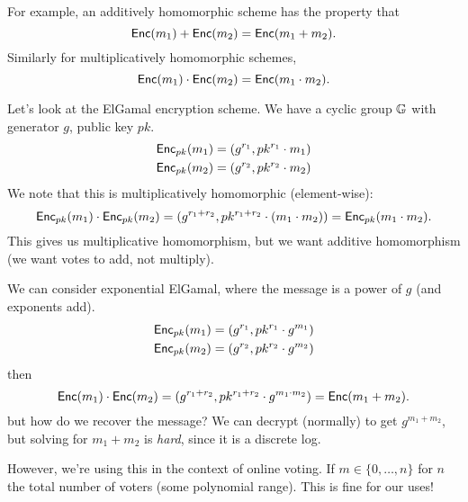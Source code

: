 For example, an additively homomorphic scheme has the property that
\[\operatorname{\mathsf{Enc}}(m_1) + \operatorname{\mathsf{Enc}}(m_2) = \operatorname{\mathsf{Enc}}(m_1 + m_2).\]
Similarly for multiplicatively homomorphic schemes,
\[\operatorname{\mathsf{Enc}}(m_1) \cdot \operatorname{\mathsf{Enc}}(m_2) = \operatorname{\mathsf{Enc}}(m_1 \cdot m_2).\]

\begin{example}
    Let's look at the ElGamal encryption scheme. We have a cyclic group $\mathbb G$ with generator $g$, public key $pk$.
    \begin{align*}
        \operatorname{\mathsf{Enc}}_{pk}(m_1) & =(g^{r_1}, pk^{r_1}\cdot m_1) \\
        \operatorname{\mathsf{Enc}}_{pk}(m_2) & =(g^{r_2}, pk^{r_2}\cdot m_2)
    \end{align*}
    We note that this is multiplicatively homomorphic (element-wise):
    \[\operatorname{\mathsf{Enc}}_{pk}(m_1)\cdot \operatorname{\mathsf{Enc}}_{pk}(m_2) = (g^{r_1 + r_2}, pk^{r_1 + r_2}\cdot (m_1\cdot m_2)) = \operatorname{\mathsf{Enc}}_{pk}(m_1\cdot m_2).\]
    This gives us multiplicative homomorphism, but we want additive homomorphism (we want votes to add, not multiply).

    We can consider exponential ElGamal, where the message is a power of $g$ (and exponents add).
    \begin{align*}
        \operatorname{\mathsf{Enc}}_{pk}(m_1) & =(g^{r_1}, pk^{r_1}\cdot g^{m_1}) \\
        \operatorname{\mathsf{Enc}}_{pk}(m_2) & =(g^{r_2}, pk^{r_2}\cdot g^{m_2})
    \end{align*}
    then
    \[\operatorname{\mathsf{Enc}}(m_1)\cdot \operatorname{\mathsf{Enc}}(m_2) = (g^{r_1 + r_2}, pk^{r_1 + r_2}\cdot g^{m_1\cdot m_2}) = \operatorname{\mathsf{Enc}}(m_1 + m_2).\]
    but how do we recover the message? We can decrypt (normally) to get $g^{m_1 + m_2}$, but solving for $m_1 + m_2$ is \emph{hard}, since it is a discrete log.

    However, we're using this in the context of online voting. If $m\in \{0, \dots, n\}$ for $n$ the total number of voters (some polynomial range). This is fine for our uses!
\end{example}